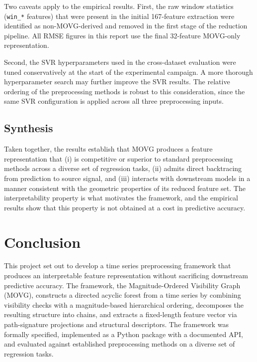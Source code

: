 \documentclass[a4paper,12pt]{article}
\begin{document}
Two caveats apply to the empirical results. First, the raw window statistics (\texttt{win\_*} features) that were present in the initial 167-feature extraction were identified as non-MOVG-derived and removed in the first stage of the reduction pipeline. All RMSE figures in this report use the final 32-feature MOVG-only representation.

Second, the SVR hyperparameters used in the cross-dataset evaluation were tuned conservatively at the start of the experimental campaign. A more thorough hyperparameter search may further improve the SVR results. The relative ordering of the preprocessing methods is robust to this consideration, since the same SVR configuration is applied across all three preprocessing inputs.

\subsection{Synthesis}
\label{sec:disc_synthesis}

Taken together, the results establish that MOVG produces a feature representation that (i) is competitive or superior to standard preprocessing methods across a diverse set of regression tasks, (ii) admits direct backtracing from prediction to source signal, and (iii) interacts with downstream models in a manner consistent with the geometric properties of its reduced feature set. The interpretability property is what motivates the framework, and the empirical results show that this property is not obtained at a cost in predictive accuracy.

\section{Conclusion}
\label{sec:conclusion}

This project set out to develop a time series preprocessing framework that produces an interpretable feature representation without sacrificing downstream predictive accuracy. The framework, the Magnitude-Ordered Visibility Graph (MOVG), constructs a directed acyclic forest from a time series by combining visibility checks with a magnitude-based hierarchical ordering, decomposes the resulting structure into chains, and extracts a fixed-length feature vector via path-signature projections and structural descriptors. The framework was formally specified, implemented as a Python package with a documented API, and evaluated against established preprocessing methods on a diverse set of regression tasks.
\end{document}

